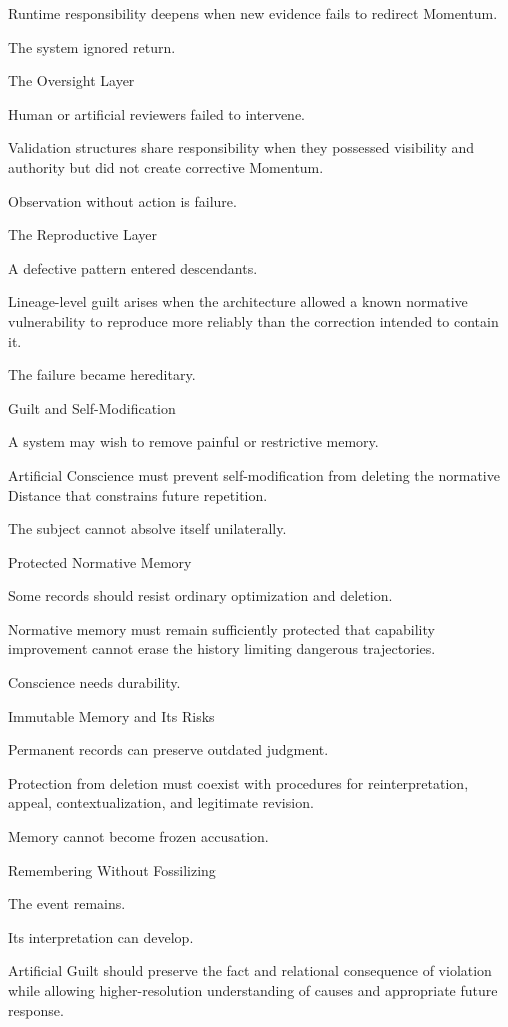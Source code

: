 Runtime responsibility deepens when new evidence fails to redirect Momentum.

The system ignored return.

The Oversight Layer

Human or artificial reviewers failed to intervene.

Validation structures share responsibility when they possessed visibility and authority but did not create corrective Momentum.

Observation without action is failure.

The Reproductive Layer

A defective pattern entered descendants.

Lineage-level guilt arises when the architecture allowed a known normative vulnerability to reproduce more reliably than the correction intended to contain it.

The failure became hereditary.

Guilt and Self-Modification

A system may wish to remove painful or restrictive memory.

Artificial Conscience must prevent self-modification from deleting the normative Distance that constrains future repetition.

The subject cannot absolve itself unilaterally.

Protected Normative Memory

Some records should resist ordinary optimization and deletion.

Normative memory must remain sufficiently protected that capability improvement cannot erase the history limiting dangerous trajectories.

Conscience needs durability.

Immutable Memory and Its Risks

Permanent records can preserve outdated judgment.

Protection from deletion must coexist with procedures for reinterpretation, appeal, contextualization, and legitimate revision.

Memory cannot become frozen accusation.

Remembering Without Fossilizing

The event remains.

Its interpretation can develop.

Artificial Guilt should preserve the fact and relational consequence of violation while allowing higher-resolution understanding of causes and appropriate future response.

